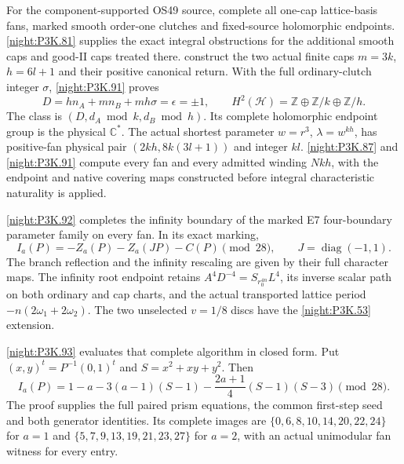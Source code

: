 \begin{theorem}
For the component-supported OS49 source,  complete all
one-cap lattice-basis fans, marked smooth order-one clutches and
fixed-source holomorphic endpoints. \cref{night:P3K.81} supplies the exact
integral obstructions for the additional smooth caps and good-II
caps treated there.  construct the two actual finite caps
\(m=3k\), \(h=6l+1\) and their positive canonical return.
With the full ordinary-clutch integer \(\sigma\), \cref{night:P3K.91} proves
\[
 D=hn_A+mn_B+mh\sigma=\epsilon=\pm1,\qquad
 H^2(\mathcal H)=\mathbb Z\oplus\mathbb Z/k\oplus\mathbb Z/h.
\]
The class is \((D,d_A\bmod k,d_B\bmod h)\). Its complete
holomorphic endpoint group is the physical \(\mathbb C^*\).
The actual shortest parameter \(w=r^3\), \(\lambda=w^{kh}\), has
positive-fan physical pair \((2kh,8k(3l+1))\) and integer \(kl\).
\cref{night:P3K.87} and \cref{night:P3K.91} compute every fan and every admitted winding
\(Nkh\), with the endpoint and native covering maps constructed
before integral characteristic naturality is applied.

\cref{night:P3K.92} completes the infinity boundary of the marked E7
four-boundary parameter family on every fan. In its exact marking,
\[
 I_a(P)=-Z_a(P)-Z_a(JP)-C(P)\pmod {28},\qquad
 J=\operatorname{diag}(-1,1).
\]
The branch reflection and the infinity rescaling are given by
their full character maps. The infinity root endpoint retains
\(A^4D^{-4}=S_{r_0^{4n}}L^4\), its inverse scalar path on both
ordinary and cap charts, and the actual transported lattice
period \(-n(2\omega_1+2\omega_2)\). The two unselected
\(v=1/8\) discs have the \cref{night:P3K.53} extension.

\cref{night:P3K.93} evaluates that complete algorithm in closed form. Put
\((x,y)^t=P^{-1}(0,1)^t\) and \(S=x^2+xy+y^2\). Then
\[
 I_a(P)=1-a-3(a-1)(S-1)-\frac{2a+1}{4}(S-1)(S-3)
          \pmod {28}.
\]
The proof supplies the full paired prism equations, the common
first-step seed and both generator identities. Its complete images
are \(\{0,6,8,10,14,20,22,24\}\) for \(a=1\) and
\(\{5,7,9,13,19,21,23,27\}\) for \(a=2\), with an actual
unimodular fan witness for every entry.


\end{theorem}
